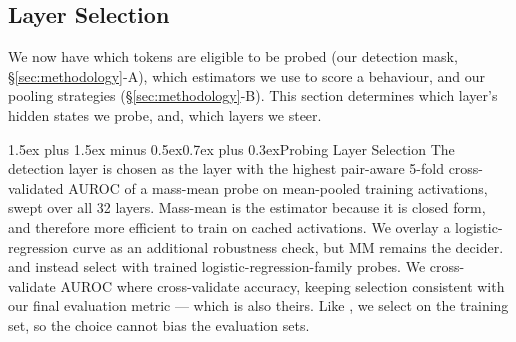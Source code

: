 \documentclass[conference]{IEEEtran}
\makeatletter
\renewcommand{\subsubsection}{\@startsection{subsubsection}{3}{1em}%
  {1.5ex plus 1.5ex minus 0.5ex}{0.7ex plus 0.3ex}{\normalfont\normalsize\itshape}}
\makeatother
\begin{document}
\subsection{Layer Selection}
We now have which tokens are eligible to be probed (our detection mask,
§\ref{sec:methodology}-A), which estimators we use to score a behaviour, and our
pooling strategies (§\ref{sec:methodology}-B). This section determines which
layer's hidden states we probe, and, which layers we steer.

\subsubsection{Probing Layer Selection}
The detection layer is chosen as the layer with the highest pair-aware 5-fold
cross-validated AUROC of a mass-mean probe on mean-pooled training activations,
swept over all 32 layers. Mass-mean is the estimator because it is closed form,
and therefore more efficient to train on cached activations. We overlay a
logistic-regression curve as an additional robustness check, but MM remains the
decider. \citet{goldowsky2025} and \citet{mckenzie2025} instead select with
trained logistic-regression-family probes. We cross-validate AUROC where
\citeauthor{mckenzie2025} cross-validate accuracy, keeping selection consistent
with our final evaluation metric --- which is also theirs. Like
\citeauthor{mckenzie2025}, we select on the training set, so the choice cannot
bias the evaluation sets.
\end{document}

